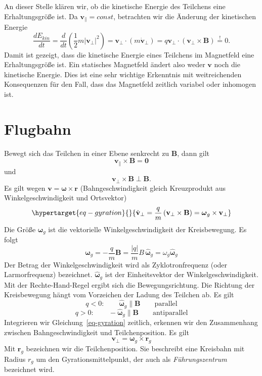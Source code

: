 \documentclass[
  a4paper,
  DIV=11]{scrreprt}
\begin{document}
An dieser Stelle klären wir, ob die kinetische Energie des Teilchens
eine Erhaltungsgröße ist. Da \(\mathbf v_\| = const\), betrachten wir
die Änderung der kinetischen Energie \[
\frac{d E_{kin}}{d t} = \frac{d}{dt} \left( \frac{1}{2} m |\mathbf v_\perp|^2  \right) =
\mathbf v_\perp \cdot (m \dot{\mathbf v}_\perp) = q \mathbf v_\perp \cdot \left( \mathbf v_\perp \times \mathbf B \right) \overset{!}{=} 0.
\] Damit ist gezeigt, dass die kinetische Energie eines Teilchens im
Magnetfeld eine Erhaltungsgröße ist. Ein statisches Magnetfeld ändert
also weder \(\mathbf v\) noch die kinetische Energie. Dies ist eine sehr
wichtige Erkenntnis mit weitreichenden Konsequenzen für den Fall, dass
das Magnetfeld zeitlich variabel oder inhomogen ist.

\hypertarget{flugbahn}{%
\section{Flugbahn}\label{flugbahn}}

Bewegt sich das Teilchen in einer Ebene senkrecht zu \(\mathbf B\), dann
gilt \[
\mathbf v _\| \times \mathbf B = \mathbf 0
\] und \[
\mathbf v_\perp \times \mathbf B \perp \mathbf B.
\] Es gilt wegen \(\mathbf v = \mathbf \omega \times \mathbf r\)
(Bahngeschwindigkeit gleich Kreuzprodukt aus Winkelgeschwindigkeit und
Ortsvektor) \begin{equation}\protect\hypertarget{eq-gyration}{}{
\dot{\mathbf v}_\perp = \frac{q}{m} \left( \mathbf v_\perp \times \mathbf B \right) = \boldsymbol \omega_g \times \mathbf v_\perp
}\label{eq-gyration}\end{equation} Die Größe \(\mathbf \omega_g\) ist
die vektorielle Winkelgeschwindigkeit der Kreisbewegung. Es folgt \[
\boldsymbol \omega_g = - \frac{q}{m} \mathbf B = 
\frac{|q|}{m} B \, \widehat{\boldsymbol \omega}_g =
\omega_g \widehat{\boldsymbol \omega}_g
\] Der Betrag der Winkelgeschwindigkeit wird als Zyklotronfrequenz (oder
Larmorfrequenz) bezeichnet. \(\widehat{\mathbf \omega}_g\) ist der
Einheitsvektor der Winkelgeschwindigkeit. Mit der Rechte-Hand-Regel
ergibt sich die Bewegungsrichtung. Die Richtung der Kreisbewegung hängt
vom Vorzeichen der Ladung des Teilchen ab. Es gilt \[
q < 0: \qquad \widehat{\boldsymbol \omega}_g \| \mathbf B \qquad \text{parallel}
\] \[
q > 0: \qquad -\widehat{\boldsymbol \omega}_g \| \mathbf B \qquad \text{antiparallel}
\] Integrieren wir Gleichung~\ref{eq-gyration} zeitlich, erkennen wir
den Zusammenhang zwischen Bahngeschwindigkeit und Teilchenposition. Es
gilt \[
\mathbf v_\perp = \boldsymbol \omega_g \times \mathbf r_g
\] Mit \(\mathbf r_g\) bezeichnen wir die Teilchenposition. Sie
beschreibt eine Kreisbahn mit Radius \(r_g\) um den
Gyrationsmittelpunkt, der auch als \emph{Führungszentrum} bezeichnet
wird.
\end{document}
